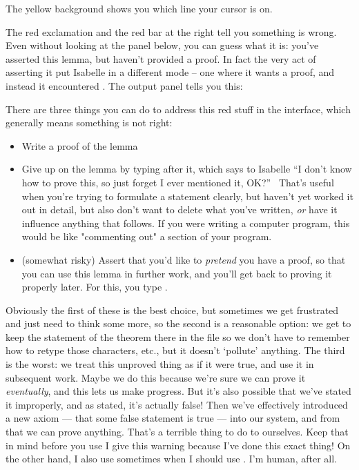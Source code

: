 The yellow background shows you which line your cursor is on. 

The red exclamation and the red bar at the right tell you something is wrong. Even without looking at the  panel below, you can guess what it is: you've asserted this lemma, but haven't provided a proof. In fact the very act of asserting it put Isabelle in a different mode -- one where it wants a proof, and instead it encountered . The output panel tells you this:

There are three things you can do to address this red stuff in the interface, which generally means something is not right:

\begin{itemize}
    \item Write a proof of the lemma
    \item Give up on the lemma by typing  after it, which says to Isabelle ``I don't know how to prove this, so just forget I ever mentioned it, OK?''  That's useful when you're trying to formulate a statement clearly, but haven't yet worked it out in detail, but also don't want to delete what you've written, \textit{or} have it influence anything that follows. If you were writing a computer program, this would be like "commenting out" a section of your program. 
    \item  (somewhat risky) Assert that you'd like to \textit{pretend} you have a proof, so that you can use this lemma in further work, and you'll get back to proving it properly later. For this, you type .
\end{itemize}

Obviously the first of these is the best choice, but sometimes we get frustrated and just need to think some more, so the second is a reasonable option: we get to keep the statement of the theorem there in the file so we don't have to remember how to retype those characters, etc., but it doesn't `pollute' anything. The third is the worst: we treat this unproved thing as if it were true, and use it in subsequent work. Maybe we do this because we're sure we can prove it \textit{eventually}, and this lets us make progress. But it's also possible that we've stated it improperly, and as stated, it's actually false! Then we've effectively introduced a new axiom --- that some false statement is true --- into our system, and from that we can prove anything. That's a terrible thing to do to ourselves. Keep that in mind before you use  I give this warning because I've done this exact thing! On the other hand, I also use  sometimes when I should use . I'm human, after all. 

